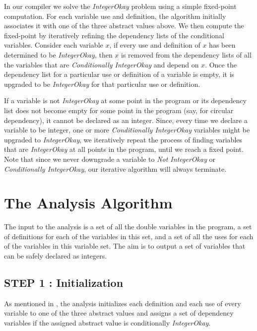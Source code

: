 In our \mixten compiler we solve the \emph{IntegerOkay} problem using a
simple fixed-point computation.   For each variable use and definition,
the algorithm initially associates it with one of the three abstract
values above.  
We then compute the fixed-point by iteratively refining the dependency lists
of the conditional variables.  Consider each variable $x$, if every use
and definition of $x$ has been determined to be \emph{IntegerOkay}, then
$x$ is removed from the dependency lists of all the variables that are
\emph{Conditionally IntegerOkay} and depend on $x$.  Once the dependency
list for a particular use or definition of a variable is empty, it is
upgraded to be \emph{IntegerOkay} for that particular use or definition.

If a variable is not \emph{IntegerOkay} at some point in the program or
its dependency list does not become empty for some point in the program
(say, for circular dependency), it cannot be declared as an integer.
Since, every time we declare a variable to be integer, one or more
\emph{Conditionally IntegerOkay} variables might be upgraded to
\emph{IntegerOkay}, we iteratively repeat the process of finding
variables that are \emph{IntegerOkay} at all points in the program,
until we reach a fixed point. Note that since we never downgrade a
variable to \emph{Not IntegerOkay} or \emph{Conditionally IntegerOkay},
our iterative algorithm will always terminate. 


\section{The Analysis Algorithm}\label{sec:algo}

The input to the analysis is a set of all the double variables in the program,
a set of definitions for each of the variables in this set, and a set of all
the uses for each of the variables in this variable set. The aim is to output a
set of variables that can be safely declared as integers.
%

\subsection{STEP 1 : Initialization}

As mentioned in , the analysis initializes each
definition and each use of every variable to one of the three abstract values
and assigns a set of dependency variables if the assigned abstract value is
conditionally \emph{IntegerOkay}. 

